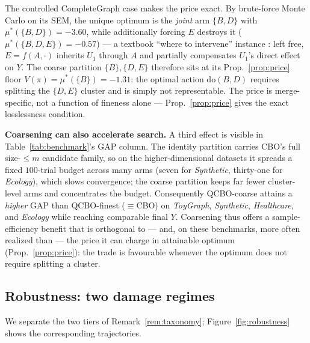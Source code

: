 \documentclass{article}
\renewcommand{\do}{\mathrm{do}}
\newcommand{\QCBO}{\textsc{QCBO}}
\newcommand{\CBO}{\textsc{CBO}}
\begin{document}
The controlled CompleteGraph case makes the price exact. By brute-force Monte
Carlo on its SEM, the unique optimum is the \emph{joint} arm $\{B,D\}$ with
$\mu^*(\{B,D\}) = -3.60$, while additionally forcing $E$ destroys it
($\mu^*(\{B,D,E\}) = -0.57$) --- a textbook ``where to intervene'' instance
\citep{lee2018structural}: left free, $E=f(A,\cdot)$ inherits $U_1$ through $A$
and partially compensates $U_1$'s direct effect on $Y$. The coarse partition
$\{B\},\{D,E\}$ therefore sits at its Prop.~\ref{prop:price} floor
$V(\pi)=\mu^*(\{B\})=-1.31$: the optimal action $\do(B,D)$ requires splitting
the $\{D,E\}$ cluster and is simply not representable. The price is
merge-specific, not a function of fineness alone --- Prop.~\ref{prop:price}
gives the exact losslessness condition.

\textbf{Coarsening can also accelerate search.} A third effect is visible in
Table~\ref{tab:benchmark}'s GAP column. The identity partition carries
\CBO{}'s full size-$\le m$ candidate family, so on the higher-dimensional
datasets it spreads a fixed $100$-trial budget across many arms (seven for
\emph{Synthetic}, thirty-one for \emph{Ecology}), which slows convergence; the
coarse partition keeps far fewer cluster-level arms and concentrates the
budget. Consequently \QCBO{}-coarse attains a \emph{higher} GAP than
\QCBO{}-finest ($\equiv$\CBO{}) on \emph{ToyGraph}, \emph{Synthetic},
\emph{Healthcare}, and \emph{Ecology} while reaching comparable final $Y$.
Coarsening thus offers a sample-efficiency benefit that is orthogonal to ---
and, on these benchmarks, more often realized than --- the price it can charge
in attainable optimum (Prop.~\ref{prop:price}): the trade is favourable
whenever the optimum does not require splitting a cluster.

\subsection{Robustness: two damage regimes}
\label{sec:robustness}

We separate the two tiers of Remark~\ref{rem:taxonomy}; Figure~\ref{fig:robustness}
shows the corresponding trajectories.
\end{document}
